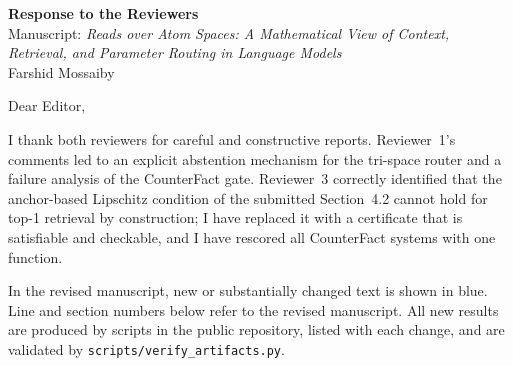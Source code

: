 \documentclass[11pt]{article}
\begin{document}
\begin{center}
{\Large\bfseries Response to the Reviewers}\\[0.5em]
Manuscript: \emph{Reads over Atom Spaces: A Mathematical View of Context, Retrieval, and Parameter Routing in Language Models}\\
Farshid Mossaiby
\end{center}

Dear Editor,

I thank both reviewers for careful and constructive reports. Reviewer~1's comments led to an explicit abstention mechanism for the tri-space router and a failure analysis of the CounterFact gate. Reviewer~3 correctly identified that the anchor-based Lipschitz condition of the submitted Section~4.2 cannot hold for top-1 retrieval by construction; I have replaced it with a certificate that is satisfiable and checkable, and I have rescored all CounterFact systems with one function.

In the revised manuscript, new or substantially changed text is shown in blue. Line and section numbers below refer to the revised manuscript. All new results are produced by scripts in the public repository, listed with each change, and are validated by \texttt{scripts/verify\_artifacts.py}.
\end{document}
